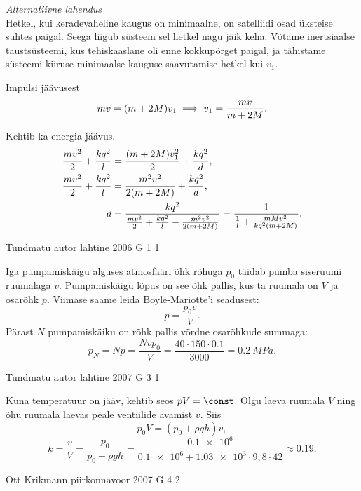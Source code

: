 \documentclass[11pt, twoside]{article}
\begin{document}
{{\vspace{0.5\baselineskip}

\emph{Alternatiivne lahendus}\\
Hetkel, kui keradevaheline kaugus on minimaalne, on satelliidi osad üksteise
suhtes paigal. Seega liigub süsteem sel hetkel nagu jäik keha. Võtame
inertsiaalse taustsüsteemi, kus tehiskaaslane oli enne kokkupõrget paigal, ja
tähistame süsteemi kiiruse minimaalse kauguse saavutamise hetkel kui $v_1$.

Impulsi jäävusest
\[ m v = (m+2M) v_1 \implies v_1 = \frac{m v}{m+2M}\text. \]

Kehtib ka energia jäävus.
\begin{align*}
\frac{m v^2}{2} + \frac{k q^2}{l} &= \frac{(m+2M) v_1^2}{2} + \frac{k q^2}{d}
\text, \\
\frac{m v^2}{2} + \frac{k q^2}{l} &= \frac{m^2 v^2}{2 (m+2M)} + \frac{k q^2}{d}
\text, \\
d &= \frac{k q^2}{\frac{m v^2}{2} + \frac{k q^2}{l} - \frac{m^2 v^2}{2 (m+2M)}}
= \frac{1}{\frac{1}{l} + \frac{m M v^2}{k q^2 (m+2M)}} \text.
\end{align*}
\fi
}

{Tundmatu autor} %
{lahtine} %
{2006} %
{G 1} %
{1} %
{

\ifSolution
Iga pumpamiskäigu alguses atmosfääri õhk rõhuga $p_0$ täidab pumba siseruumi ruumalaga $v$. Pumpamiskäigu lõpus on see õhk pallis, kus ta ruumala on $V$ ja osarõhk $p$. Viimase saame leida Boyle-Mariotte’i seadusest:
\[
p = \frac{p_0v}{V}.
\]
Pärast $N$ pumpamiskäiku on rõhk pallis võrdne osarõhkude summaga:
\[
p_{N}=N p=\frac{N v p_{0}}{V}=\frac{40 \cdot 150 \cdot \num{0,1}}{3000}=\SI{0,2}{MPa}.
\]
\fi
}

{Tundmatu autor} %
{lahtine} %
{2007} %
{G 3} %
{1} %
{

\ifSolution
Kuna temperatuur on jääv, kehtib seos $pV = \const$. Olgu laeva ruumala $V$ ning õhu ruumala laevas peale ventiilide avamist $v$. Siis
\[
p_{0} V=\left(p_{0}+\rho g h\right) v,
\]
\[
k=\frac{v}{V}=\frac{p_{0}}{p_{0}+\rho g h}=\frac{\num{0,1e6}}{\num{0,1e6}+\num{1,03e3} \cdot 9,8 \cdot 42} \approx \num{0,19}.
\]
\fi
}

{Ott Krikmann} %
{piirkonnavoor} %
{2007} %
{G 4} %
{2} %
{

}}
\end{document}
